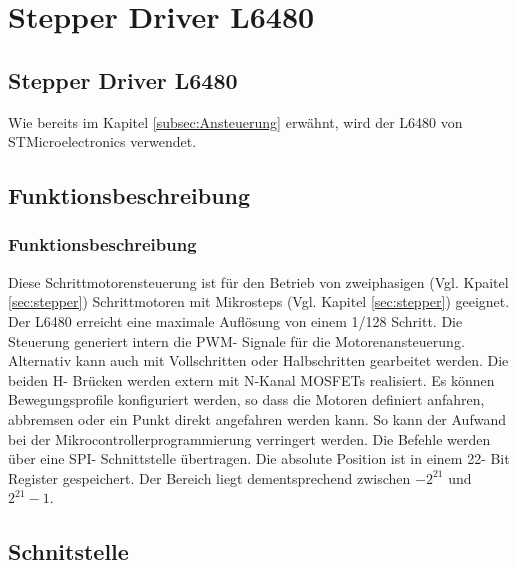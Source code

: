 \ifSTANDALONE
    \section{Stepper Driver L6480} \label{sec:L6480}
\fi
\ifEMBED
    \subsection{Stepper Driver L6480} \label{sec:L6480}
\fi
\ifEMBED
    \BLDCcollab
\fi
Wie bereits im Kapitel \ref*{subsec:Ansteuerung} erwähnt, wird der L6480 von STMicroelectronics verwendet. 

\ifSTANDALONE
    \subsection{Funktionsbeschreibung}
\fi
\ifEMBED
    \subsubsection{Funktionsbeschreibung}
\fi
    Diese Schrittmotorensteuerung ist für den Betrieb von zweiphasigen (Vgl. 
    Kpaitel \ref{sec:stepper}) Schrittmotoren mit Mikrosteps (Vgl. Kapitel 
    \ref{sec:stepper}) geeignet. Der L6480 erreicht eine maximale Auflösung 
    von einem 1/128 Schritt. Die Steuerung generiert intern die PWM- Signale 
    für die Motorenansteuerung. Alternativ kann auch mit Vollschritten oder 
    Halbschritten gearbeitet werden. Die beiden H- Brücken werden extern mit 
    N-Kanal MOSFETs realisiert. Es können Bewegungsprofile konfiguriert 
    werden, so dass die Motoren definiert anfahren, abbremsen oder ein Punkt 
    direkt angefahren werden kann. So kann der Aufwand bei der 
    Mikrocontrollerprogrammierung verringert werden. Die Befehle werden über 
    eine SPI- Schnittstelle übertragen. Die absolute Position ist in einem 22- 
    Bit Register gespeichert. Der Bereich liegt dementsprechend zwischen 
    \(-2^{21}\) und \(2^{21}-1\). \cite{Datasheet:L6480} 

\ifSTANDALONE
    \subsection{Schnitstelle}
\fi
\ifEMBED
